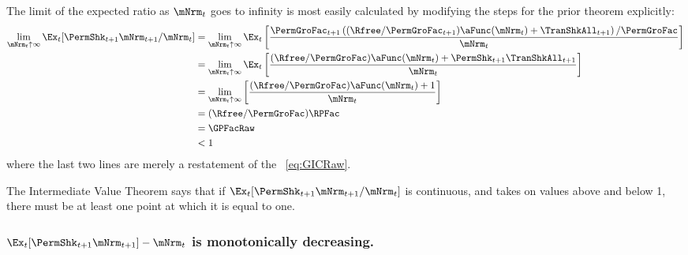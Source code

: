 \documentclass[\econtexRoot/BufferStockTheory]{subfiles}
\begin{document}
The limit of the expected ratio as $\mNrm_{t}$ goes to infinity is most easily calculated by modifying the steps for the prior theorem explicitly:
\begin{equation}\begin{gathered}\begin{aligned}
  \lim_{\mNrm_{t} \uparrow \infty} \Ex_{t}[\PermShk_{t+1}\mNrm_{t+1}/\mNrm_{t}]  & =   
                                                                  \lim_{\mNrm_{t} \uparrow \infty} 
                                                                  \Ex_{t}\left[\frac{\PermGroFac_{t+1}\left((\Rfree/\PermGroFac_{t+1})\aFunc(\mNrm_{t})+{\TranShkAll}_{t+1}\right)/\PermGroFac}{\mNrm_{t}}\right] \notag 
  \\   & =   \lim_{\mNrm_{t} \uparrow \infty} \Ex_{t}\left[
         \frac{(\Rfree/\PermGroFac)\aFunc(\mNrm_{t})+\PermShk_{t+1}{\TranShkAll}_{t+1}}{\mNrm_{t}}
         \right] \notag 
  \\   & =   \lim_{\mNrm_{t} \uparrow \infty} \left[
         \frac{(\Rfree/\PermGroFac)\aFunc(\mNrm_{t})+1}{\mNrm_{t}}
         \right] \notag 
  \\  & = (\Rfree/\PermGroFac)\RPFac \label{eq:emgro2}
  \\  & = \GPFacRaw \notag
  \\  & < 1 \notag
\end{aligned}\end{gathered}\end{equation}
where the last two lines are merely a restatement of the \GICRaw~\eqref{eq:GICRaw}.

The Intermediate Value Theorem says that if $\Ex_{t}[\PermShk_{t+1}\mNrm_{t+1}/\mNrm_t]$ is continuous, and takes on values above and below 1, there must be at least one point at which it is equal to one.

\subsubsection{\texorpdfstring{$\Ex_{t}[\PermShk_{t+1}\mNrm_{t+1}] -\mNrm_t$}{PermShk m{t+1} --- m{t}} is monotonically decreasing.}
\end{document}
